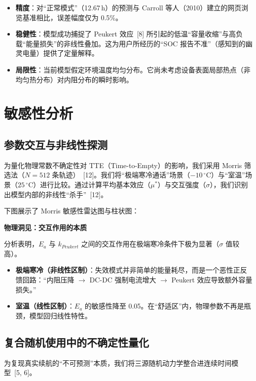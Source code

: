\documentclass[11pt,a4paper]{ctexart}
\newcommand{\degC}{\ensuremath{^{\circ}\mathrm{C}}}
\begin{document}
\begin{itemize}
\item \textbf{精度}：对“正常模式”（12.67\,h）的预测与 Carroll 等人（2010）建立的网页浏览基准相比，误差幅度仅为 0.5\%。
\item \textbf{稳健性}：模型成功捕捉了 Peukert 效应~[8] 所引起的低温“容量收缩”与高负载“能量损失”的非线性叠加。这为用户所经历的“SOC 报告不准”（感知到的幽灵电量）提供了定量解释。
\item \textbf{局限性}：当前模型假定环境温度均匀分布。它尚未考虑设备表面局部热点（非均匀热分布）对内阻分布的瞬时影响。
\end{itemize}

\section{敏感性分析}

\subsection{参数交互与非线性探测}

为量化物理常数不确定性对 TTE（Time-to-Empty）的影响，我们采用 Morris 筛选法（$N=512$ 条轨迹）~[12]。我们将“极端寒冷通话”场景（$-10\,\degC$）与“室温”场景（$25\,\degC$）进行比较。通过计算平均基本效应（$\mu^{*}$）与交互强度（$\sigma$），我们识别出模型内部的非线性“杀手”~[12]。

下图展示了 Morris 敏感性雷达图与柱状图：

\textbf{物理洞见：交互作用的本质}

分析表明，$E_a$ 与 $k_{Peukert}$ 之间的交互作用在极端寒冷条件下极为显著（$\sigma$ 值较高）。

\begin{itemize}
\item \textbf{极端寒冷（非线性区制）}：失效模式并非简单的能量耗尽，而是一个恶性正反馈回路：“内阻压降 $\rightarrow$ DC-DC 强制电流增大 $\rightarrow$ Peukert 效应导致额外容量损失。”
\item \textbf{室温（线性区制）}：$E_a$ 的敏感性降至 0.05。在“舒适区”内，物理参数不再是瓶颈，模型回归线性特性。
\end{itemize}

\subsection{复合随机使用中的不确定性量化}

为复现真实续航的“不可预测”本质，我们将三源随机动力学整合进连续时间模型~[5, 6]。
\end{document}
